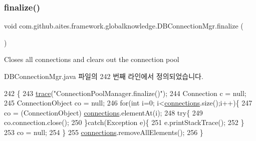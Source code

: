 \subsubsection{\texorpdfstring{finalize()}{finalize()}}
{\footnotesize\ttfamily void com.\+github.\+aites.\+framework.\+globalknowledge.\+D\+B\+Connection\+Mgr.\+finalize (\begin{DoxyParamCaption}{ }\end{DoxyParamCaption})}



Closes all connections and clears out the connection pool 



D\+B\+Connection\+Mgr.\+java 파일의 242 번째 라인에서 정의되었습니다.


\begin{DoxyCode}
242                           \{
243         \mbox{\hyperlink{classcom_1_1github_1_1aites_1_1framework_1_1globalknowledge_1_1_d_b_connection_mgr_ae9ff677183d99acafb2da9cd8ba6de20}{trace}}(\textcolor{stringliteral}{"ConnectionPoolManager.finalize()"});
244         Connection c = null;
245         ConnectionObject co = null;
246         \textcolor{keywordflow}{for}(\textcolor{keywordtype}{int} i=0; i<\mbox{\hyperlink{classcom_1_1github_1_1aites_1_1framework_1_1globalknowledge_1_1_d_b_connection_mgr_a2a178e6371fa020ccca3e12574ef2e14}{connections}}.size();i++)\{
247             co = (ConnectionObject) \mbox{\hyperlink{classcom_1_1github_1_1aites_1_1framework_1_1globalknowledge_1_1_d_b_connection_mgr_a2a178e6371fa020ccca3e12574ef2e14}{connections}}.elementAt(i);
248             \textcolor{keywordflow}{try}\{
249                 co.connection.close();
250             \}\textcolor{keywordflow}{catch}(Exception e)\{
251                 e.printStackTrace();
252             \}
253             co = null;
254         \}
255         \mbox{\hyperlink{classcom_1_1github_1_1aites_1_1framework_1_1globalknowledge_1_1_d_b_connection_mgr_a2a178e6371fa020ccca3e12574ef2e14}{connections}}.removeAllElements();
256     \}
\end{DoxyCode}
\mbox{\label{classcom_1_1github_1_1aites_1_1framework_1_1globalknowledge_1_1_d_b_connection_mgr_a4c1302a674f9c74b55f6fae96bf79b64}} 
